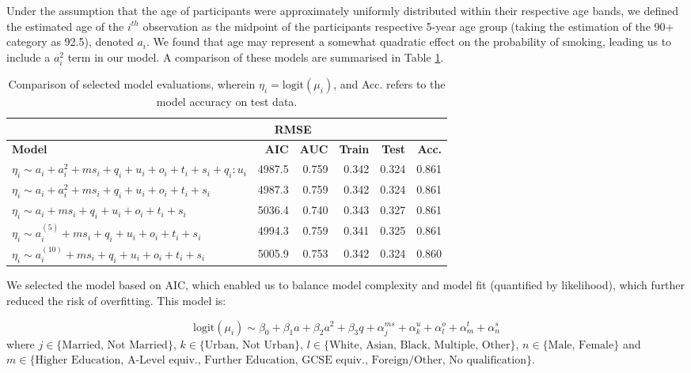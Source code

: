 \documentclass[
  11pt,
  twocolumn]{article}
\begin{document}
Under the assumption that the age of participants were approximately
uniformly distributed within their respective age bands, we defined the
estimated age of the \(i^{th}\) observation as the midpoint of the
participants respective 5-year age group (taking the estimation of the
90+ category as 92.5), denoted \(a_i\). We found that age may represent
a somewhat quadratic effect on the probability of smoking, leading us to
include a \(a_i^2\) term in our model. A comparison of these models are
summarised in Table \ref{tab:output-model-selection-table}.

\begin{table}

\caption{\label{tab:outputmodelselectiontable}Comparison of selected model evaluations, wherein $\eta_i = \text{logit}(\mu_i)$, and Acc. refers to the model accuracy on test data.\label{tab:output-model-selection-table}}
\centering
\fontsize{9}{11}\selectfont
\begin{tabular}[t]{>{\raggedright\arraybackslash}p{7em}|r|r|r|r|r}
\hline
\multicolumn{3}{c|}{ } & \multicolumn{2}{c|}{RMSE} & \multicolumn{1}{c}{ } \\
\cline{4-5}
\textbf{Model} & \textbf{AIC} & \textbf{AUC} & \textbf{Train} & \textbf{Test} & \textbf{Acc.}\\
\hline
$\eta_i \sim a_i + a_i^2 + ms_i + q_i + u_i + o_i + t_i + s_i + q_i:u_i$ & 4987.5 & 0.759 & 0.342 & 0.324 & 0.861\\
\hline
$\eta_i \sim a_i + a_i^2 + ms_i + q_i + u_i + o_i + t_i + s_i$ & 4987.3 & 0.759 & 0.342 & 0.324 & 0.861\\
\hline
$\eta_i \sim a_i + ms_i + q_i + u_i + o_i + t_i + s_i$ & 5036.4 & 0.740 & 0.343 & 0.327 & 0.861\\
\hline
$\eta_i \sim a_i^{(5)} + ms_i + q_i + u_i + o_i + t_i + s_i$ & 4994.3 & 0.759 & 0.341 & 0.325 & 0.861\\
\hline
$\eta_i \sim a_i^{(10)} + ms_i + q_i + u_i + o_i + t_i + s_i$ & 5005.9 & 0.753 & 0.342 & 0.324 & 0.860\\
\hline
\end{tabular}
\end{table}

We selected the model based on AIC, which enabled us to balance model
complexity and model fit (quantified by likelihood), which further
reduced the risk of overfitting. This model is:

\[\text{logit}(\mu_i) \sim \beta_0 + \beta_1a + \beta_2a^2 + \beta_3q + \alpha^{ms}_j + \alpha^{u}_k + \alpha^{o}_l + \alpha^{t}_m + \alpha^{s}_n\]
where \(j \in \{\text{Married, Not Married}\}\),
\(k \in \{\text{Urban, Not Urban}\}\),
\(l \in \{\text{White, Asian, Black, Multiple, Other}\}\),
\(n \in \{\text{Male, Female}\}\) and
\(m \in \{\text{Higher Education, A-Level equiv., Further Education, GCSE equiv., Foreign/Other, No qualification}\}\).
\end{document}
